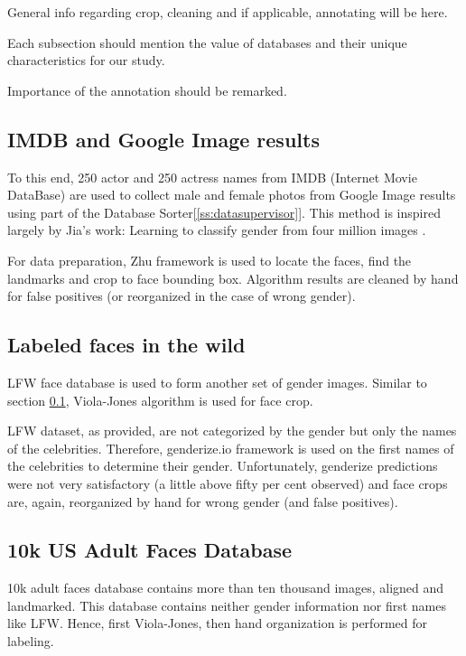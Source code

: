 \documentclass[runningheads]{llncs}
\begin{document}
General info regarding crop, cleaning and if applicable, annotating will be here.

Each subsection should mention the value of databases and their unique characteristics for our study.

Importance of the annotation\cite{mathias2014face} should be remarked.


\subsection{IMDB and Google Image results}\label{[ss-dbGenderGoogleImages]}

To this end, 250 actor and 250 actress names from IMDB (Internet Movie DataBase) are used to collect male and female photos from Google Image results using part of the Database Sorter\ref{[ss:datasupervisor]}. This method is inspired largely by Jia's work: Learning to classify gender from four million images
\cite{jia2015learning}.

For data preparation, Zhu framework\cite{zhu2012face} is used to locate the faces, find the landmarks and crop to face bounding box. Algorithm results are cleaned by hand for false positives (or reorganized in the case of wrong gender).

\subsection{Labeled faces in the wild}\label{ss-dbLFW}
LFW\cite{LFWTech} face database is used to form another set of gender images. Similar to section \ref{[ss-dbGenderGoogleImages]}, Viola-Jones algorithm is used for face crop.

LFW dataset, as provided, are not categorized by the gender but only the names of the celebrities. Therefore, genderize.io framework is used on the first names of the celebrities to determine their gender. Unfortunately, genderize predictions were not very satisfactory (a little above fifty per cent observed) and face crops are, again, reorganized by hand for wrong gender (and false positives).

\subsection{10k US Adult Faces Database}\label{ss-db10k}
10k adult faces\cite{bainbridge2013intrinsic} database contains more than ten thousand images, aligned and landmarked. This database contains neither gender information nor first names like LFW. Hence, first Viola-Jones, then hand organization is performed for labeling.
\end{document}
